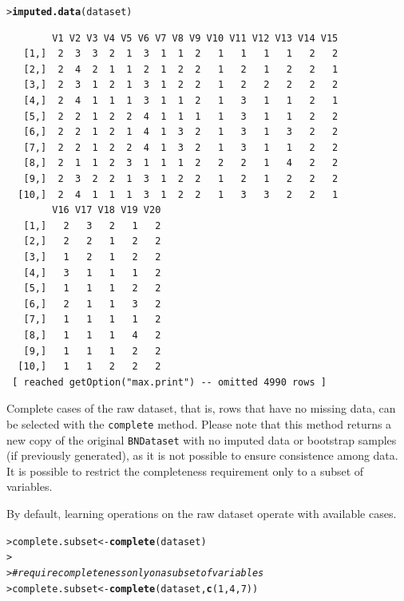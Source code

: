 \documentclass{article}\usepackage[]{graphicx}\usepackage[]{color}
\makeatletter
\newcommand{\hlnum}[1]{\textcolor[rgb]{0.686,0.059,0.569}{#1}}%
\newcommand{\hlcom}[1]{\textcolor[rgb]{0.678,0.584,0.686}{\textit{#1}}}%
\newcommand{\hlstd}[1]{\textcolor[rgb]{0.345,0.345,0.345}{#1}}%
\newcommand{\hlkwb}[1]{\textcolor[rgb]{0.69,0.353,0.396}{#1}}%
\newcommand{\hlkwd}[1]{\textcolor[rgb]{0.737,0.353,0.396}{\textbf{#1}}}%
\newenvironment{kframe}{%
 \def\at@end@of@kframe{}%
 \ifinner\ifhmode%
  \def\at@end@of@kframe{\end{minipage}}%
  \begin{minipage}{\columnwidth}%
 \fi\fi%
 \def\FrameCommand##1{\hskip\@totalleftmargin \hskip-\fboxsep
 \colorbox{shadecolor}{##1}\hskip-\fboxsep
     \hskip-\linewidth \hskip-\@totalleftmargin \hskip\columnwidth}%
 \MakeFramed {\advance\hsize-\width
   \@totalleftmargin\z@ \linewidth\hsize
   \@setminipage}}%
 {\par\unskip\endMakeFramed%
 \at@end@of@kframe}
\newenvironment{knitrout}{}{} %
\newcommand{\Robject}[1]{{\texttt{#1}}}
\newcommand{\Rmethod}[1]{{\texttt{#1}}}
\makeatother
\begin{document}
\begin{knitrout}
\begin{kframe}
{\ttfamily\noindent\itshape\color{messagecolor}{bnstruct :: imputation finished.}}\begin{alltt}
\hlstd{> }\hlkwd{imputed.data}\hlstd{(dataset)}
\end{alltt}
\begin{verbatim}
        V1 V2 V3 V4 V5 V6 V7 V8 V9 V10 V11 V12 V13 V14 V15
   [1,]  2  3  3  2  1  3  1  1  2   1   1   1   1   2   2
   [2,]  2  4  2  1  1  2  1  2  2   1   2   1   2   2   1
   [3,]  2  3  1  2  1  3  1  2  2   1   2   2   2   2   2
   [4,]  2  4  1  1  1  3  1  1  2   1   3   1   1   2   1
   [5,]  2  2  1  2  2  4  1  1  1   1   3   1   1   2   2
   [6,]  2  2  1  2  1  4  1  3  2   1   3   1   3   2   2
   [7,]  2  2  1  2  2  4  1  3  2   1   3   1   1   2   2
   [8,]  2  1  1  2  3  1  1  1  2   2   2   1   4   2   2
   [9,]  2  3  2  2  1  3  1  2  2   1   2   1   2   2   2
  [10,]  2  4  1  1  1  3  1  2  2   1   3   3   2   2   1
        V16 V17 V18 V19 V20
   [1,]   2   3   2   1   2
   [2,]   2   2   1   2   2
   [3,]   1   2   1   2   2
   [4,]   3   1   1   1   2
   [5,]   1   1   1   2   2
   [6,]   2   1   1   3   2
   [7,]   1   1   1   1   2
   [8,]   1   1   1   4   2
   [9,]   1   1   1   2   2
  [10,]   1   1   2   2   2
 [ reached getOption("max.print") -- omitted 4990 rows ]
\end{verbatim}
\end{kframe}
\end{knitrout}

Complete cases of the raw dataset, that is, rows that have no missing data, can be selected with the \Rmethod{complete} method. Please note that this method returns a new copy of the original
\Robject{BNDataset} with no imputed data or bootstrap samples (if previously generated), as it
is not possible to ensure consistence among data.
It is possible to restrict the completeness requirement only to a subset of variables.

By default, learning operations on the raw dataset operate with available cases.

\begin{knitrout}
\color{fgcolor}\begin{kframe}
\begin{alltt}
\hlstd{> }\hlstd{complete.subset} \hlkwb{<-} \hlkwd{complete}\hlstd{(dataset)}
\hlstd{> }
\hlstd{> }\hlcom{# require completeness only on a subset of variables}
\hlstd{> }\hlstd{complete.subset} \hlkwb{<-} \hlkwd{complete}\hlstd{(dataset,} \hlkwd{c}\hlstd{(}\hlnum{1}\hlstd{,}\hlnum{4}\hlstd{,}\hlnum{7}\hlstd{))}
\end{alltt}
\end{kframe}
\end{knitrout}
\end{document}
